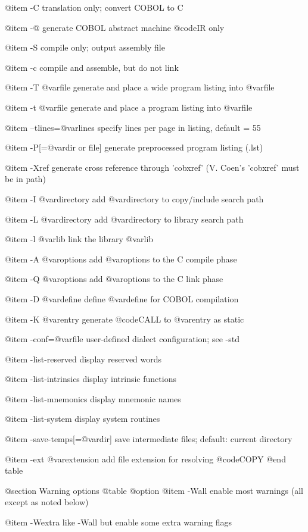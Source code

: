 @item -C
translation only; convert COBOL to C

@item -@
generate COBOL abstract machine @code{IR} only

@item -S
compile only; output assembly file

@item -c
compile and assemble, but do not link

@item -T @var{file}
generate and place a wide program listing into @var{file}

@item -t @var{file}
generate and place a program listing into @var{file}

@item --tlines=@var{lines}
specify lines per page in listing, default = 55

@item -P[=@var{dir or file}]
generate preprocessed program listing (.lst)

@item -Xref
generate cross reference through 'cobxref'
(V. Coen's 'cobxref' must be in path)

@item -I @var{directory}
add @var{directory} to copy/include search path

@item -L @var{directory}
add @var{directory} to library search path

@item -l @var{lib}
link the library @var{lib}

@item -A @var{options}
add @var{options} to the C compile phase

@item -Q @var{options}
add @var{options} to the C link phase

@item -D @var{define}
define @var{define} for COBOL compilation

@item -K @var{entry}
generate @code{CALL} to @var{entry} as static

@item -conf=@var{file}
user-defined dialect configuration; see -std

@item -list-reserved
display reserved words

@item -list-intrinsics
display intrinsic functions

@item -list-mnemonics
display mnemonic names

@item -list-system
display system routines

@item -save-temps[=@var{dir}]
save intermediate files; default: current directory

@item -ext @var{extension}
add file extension for resolving @code{COPY}
@end table

@section Warning options
@table @option
@item -Wall
enable most warnings (all except as noted below)

@item -Wextra
like -Wall but enable some extra warning flags

